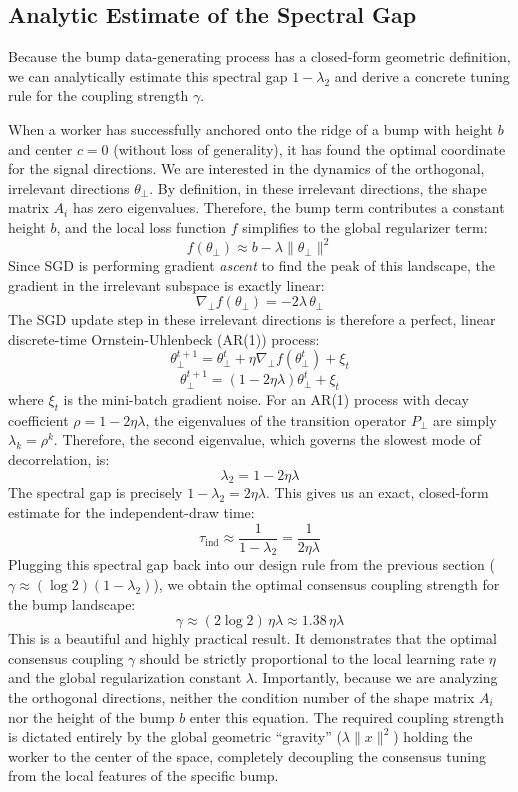 \documentclass{article}
\begin{document}
\subsection{Analytic Estimate of the Spectral Gap}

Because the bump data-generating process has a closed-form geometric definition, we can analytically estimate this spectral gap $1-\lambda_2$ and derive a concrete tuning rule for the coupling strength $\gamma$.

When a worker has successfully anchored onto the ridge of a bump with height $b$ and center $c=0$ (without loss of generality), it has found the optimal coordinate for the signal directions. We are interested in the dynamics of the orthogonal, irrelevant directions $\theta_{\perp}$. By definition, in these irrelevant directions, the shape matrix $A_i$ has zero eigenvalues. Therefore, the bump term contributes a constant height $b$, and the local loss function $f$ simplifies to the global regularizer term:
\[
f(\theta_{\perp}) \approx b - \lambda \|\theta_{\perp}\|^2
\]
Since SGD is performing gradient \emph{ascent} to find the peak of this landscape, the gradient in the irrelevant subspace is exactly linear:
\[
\nabla_{\perp} f(\theta_{\perp}) = -2\lambda \, \theta_{\perp}
\]
The SGD update step in these irrelevant directions is therefore a perfect, linear discrete-time Ornstein-Uhlenbeck (AR(1)) process:
\[
\theta_{\perp}^{t+1} = \theta_{\perp}^t + \eta \nabla_{\perp} f(\theta_{\perp}^t) + \xi_t
\]
\[
\theta_{\perp}^{t+1} = (1 - 2\eta \lambda) \theta_{\perp}^t + \xi_t
\]
where $\xi_t$ is the mini-batch gradient noise. For an AR(1) process with decay coefficient $\rho = 1 - 2\eta \lambda$, the eigenvalues of the transition operator $P_{\perp}$ are simply $\lambda_k = \rho^k$. Therefore, the second eigenvalue, which governs the slowest mode of decorrelation, is:
\[
\lambda_2 = 1 - 2\eta \lambda
\]
The spectral gap is precisely $1-\lambda_2 = 2\eta \lambda$. This gives us an exact, closed-form estimate for the independent-draw time:
\[
\tau_{\mathrm{ind}} \approx \frac{1}{1-\lambda_2} = \frac{1}{2\eta \lambda}
\]
Plugging this spectral gap back into our design rule from the previous section ($\gamma \approx (\log 2)(1-\lambda_2)$), we obtain the optimal consensus coupling strength for the bump landscape:
\[
\gamma \approx (2 \log 2) \, \eta \lambda \approx 1.38 \, \eta \lambda
\]
This is a beautiful and highly practical result. It demonstrates that the optimal consensus coupling $\gamma$ should be strictly proportional to the local learning rate $\eta$ and the global regularization constant $\lambda$. Importantly, because we are analyzing the orthogonal directions, neither the condition number of the shape matrix $A_i$ nor the height of the bump $b$ enter this equation. The required coupling strength is dictated entirely by the global geometric ``gravity'' ($\lambda \|x\|^2$) holding the worker to the center of the space, completely decoupling the consensus tuning from the local features of the specific bump.
\end{document}
